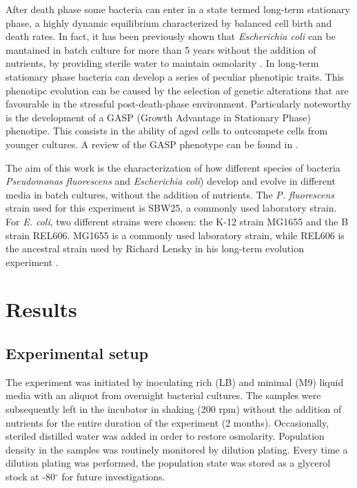 \documentclass[
	11pt,
	a4paper,
]{article} %
\begin{document}
\begin{multicols}{2}
After death phase some bacteria can enter in a state termed long-term stationary phase, a highly dynamic equilibrium characterized by balanced cell birth and death rates.
In fact, it has been previously shown that \textit{Escherichia coli} can be mantained in batch culture for more than 5 years without the addition of nutrients, by providing sterile water to maintain osmolarity \citep{Finkel1999}.
In long-term stationary phase bacteria can develop a series of peculiar phenotipic traits.
This phenotipc evolution can be caused by the selection of genetic alterations that are favourable in the stressful post-death-phase environment.
Particularly noteworthy is the development of a GASP (Growth Advantage in Stationary Phase) phenotipe.
This consists in the ability of aged cells to outcompete cells from younger cultures.
A review of the GASP phenotype can be found in \citet{Zambrano1996}.

The aim of this work is the characterization of how different species of bacteria \textit{Pseudomonas fluorescens} and \textit{Escherichia coli}) develop and evolve in different media in batch cultures, without the addition of nutrients.
The \textit{P. fluorescens} strain used for this experiment is SBW25, a commonly used laboratory strain.
For \textit{E. coli}, two different strains were chosen: the K-12 strain MG1655 and the B strain REL606.
MG1655 is a commonly used laboratory strain, while REL606 is the ancestral strain used by Richard Lensky in his long-term evolution experiment \citep{Good2017}.


\section*{Results}
\subsection*{Experimental setup}
The experiment was initiated by inoculating rich (LB) and minimal (M9) liquid media with an aliquot from overnight bacterial cultures.
The samples were subsequently left in the incubator in shaking (200 rpm) without the addition of nutrients for the entire duration of the experiment (2 months).
Occasionally, steriled distilled water was added in order to restore osmolarity.
Population density in the samples was routinely monitored by dilution plating.
Every time a dilution plating was performed, the population state was stored as a glycerol stock at -80$^\circ$ for future investigations.


\end{multicols}
\end{document}
